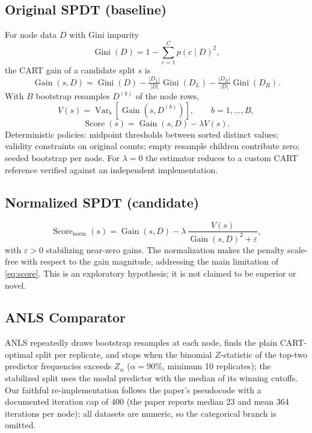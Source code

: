\documentclass[conference]{IEEEtran}
\begin{document}
\subsection{Original SPDT (baseline)}
For node data $D$ with Gini impurity
\begin{equation}
\operatorname{Gini}(D) = 1 - \sum_{c=1}^{C} p(c\mid D)^2,
\label{eq:gini}
\end{equation}
the CART gain of a candidate split $s$ is
\begin{equation}
\operatorname{Gain}(s,D) = \operatorname{Gini}(D)
- \tfrac{|D_L|}{|D|}\operatorname{Gini}(D_L)
- \tfrac{|D_R|}{|D|}\operatorname{Gini}(D_R).
\label{eq:gain}
\end{equation}
With $B$ bootstrap resamples $D^{(b)}$ of the node rows,
\begin{equation}
V(s) = \operatorname{Var}_{b}\!\left[\operatorname{Gain}(s,D^{(b)})\right],
\qquad b = 1,\dots,B,
\label{eq:var}
\end{equation}
\begin{equation}
\operatorname{Score}(s) = \operatorname{Gain}(s,D) - \lambda V(s).
\label{eq:score}
\end{equation}
Deterministic policies: midpoint thresholds between sorted distinct
values; validity constraints on original counts; empty resample children
contribute zero; seeded bootstrap per node. For $\lambda{=}0$ the
estimator reduces to a custom CART reference verified against an
independent implementation.
\subsection{Normalized SPDT (candidate)}
\begin{equation}
\operatorname{Score}_{\mathrm{norm}}(s) =
\operatorname{Gain}(s,D)
- \lambda\,\frac{V(s)}{\operatorname{Gain}(s,D)^2 + \varepsilon},
\label{eq:norm}
\end{equation}
with $\varepsilon>0$ stabilizing near-zero gains. The normalization makes
the penalty scale-free with respect to the gain magnitude, addressing
the main limitation of \eqref{eq:score}. This is an exploratory
hypothesis; it is not claimed to be superior or novel.
\subsection{ANLS Comparator}
ANLS \cite{lee2024anls} repeatedly draws bootstrap resamples at each
node, finds the plain CART-optimal split per replicate, and stops when
the binomial $Z$-statistic of the top-two predictor frequencies exceeds
$Z_\alpha$ ($\alpha{=}90\%$, minimum 10 replicates); the stabilized
split uses the modal predictor with the median of its winning cutoffs.
Our faithful re-implementation follows the paper's pseudocode with a
documented iteration cap of 400 (the paper reports median 23 and mean
364 iterations per node); all datasets are numeric, so the categorical
branch is omitted.
\end{document}
